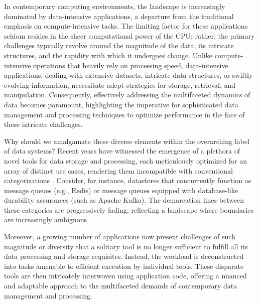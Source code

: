     
    


In contemporary computing environments, the landscape is increasingly dominated by data-intensive applications, a departure from the traditional emphasis on compute-intensive tasks. The limiting factor for these applications seldom resides in the sheer computational power of the CPU; rather, the primary challenges typically revolve around the magnitude of the data, its intricate structures, and the rapidity with which it undergoes change. Unlike compute-intensive operations that heavily rely on processing speed, data-intensive applications, dealing with extensive datasets, intricate data structures, or swiftly evolving information, necessitate adept strategies for storage, retrieval, and manipulation. Consequently, effectively addressing the multifaceted dynamics of data becomes paramount, highlighting the imperative for sophisticated data management and processing techniques to optimize performance in the face of these intricate challenges.

Why should we amalgamate these diverse elements within the overarching label of data systems? Recent years have witnessed the emergence of a plethora of novel tools for data storage and processing, each meticulously optimized for an array of distinct use cases, rendering them incompatible with conventional categorizations \cite{stonebraker2005onesize}. Consider, for instance, datastores that concurrently function as message queues (e.g., Redis) or message queues equipped with database-like durability assurances (such as Apache Kafka). The demarcation lines between these categories are progressively fading, reflecting a landscape where boundaries are increasingly ambiguous.

Moreover, a growing number of applications now present challenges of such magnitude or diversity that a solitary tool is no longer sufficient to fulfill all its data processing and storage requisites. Instead, the workload is deconstructed into tasks amenable to efficient execution by individual tools. These disparate tools are then intricately interwoven using application code, offering a nuanced and adaptable approach to the multifaceted demands of contemporary data management and processing.